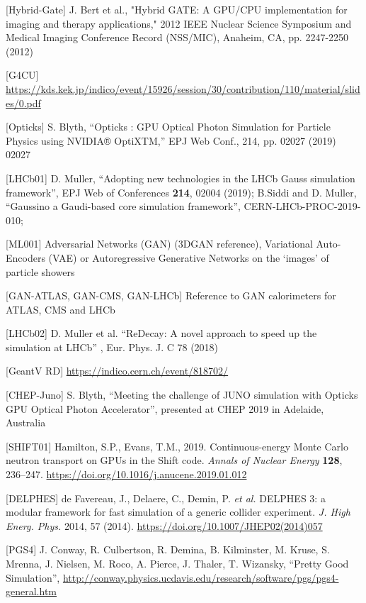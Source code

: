 \documentclass[10pt,a4paper]{article}
\begin{document}
{[}Hybrid-Gate{]} J. Bert et al., "Hybrid GATE: A GPU/CPU implementation
for imaging and therapy applications," 2012 IEEE Nuclear Science
Symposium and Medical Imaging Conference Record (NSS/MIC), Anaheim, CA,
pp. 2247-2250 (2012)

{[}G4CU{]}
\url{https://kds.kek.jp/indico/event/15926/session/30/contribution/110/material/slides/0.pdf}

{[}Opticks{]} S. Blyth, ``Opticks : GPU Optical Photon Simulation for
Particle Physics using NVIDIA® OptiXTM,'' EPJ Web Conf., 214, pp. 02027
(2019) 02027

{[}LHCb01{]} D. Muller, ``Adopting new technologies in the LHCb Gauss
simulation framework'', EPJ Web of Conferences \textbf{214}, 02004
(2019); B.Siddi and D. Muller, ``Gaussino a Gaudi-based core simulation
framework'', CERN-LHCb-PROC-2019-010;

{[}ML001{]} Adversarial Networks (GAN) (3DGAN reference), Variational
Auto-Encoders (VAE) or Autoregressive Generative Networks on the
`images' of particle showers

{[}GAN-ATLAS, GAN-CMS, GAN-LHCb{]} Reference to GAN calorimeters for
ATLAS, CMS and LHCb

{[}LHCb02{]} D. Muller et al. ``ReDecay: A novel approach to speed up
the simulation at LHCb'' , Eur. Phys. J. C 78 (2018)

{[}GeantV RD{]}
\href{https://indico.cern.ch/event/818702/}{{https://indico.cern.ch/event/818702/}}

{[}CHEP-Juno{]} S. Blyth, ``Meeting the challenge of JUNO simulation
with Opticks GPU Optical Photon Accelerator'', presented at CHEP 2019 in
Adelaide, Australia

{[}SHIFT01{]} Hamilton, S.P., Evans, T.M., 2019. Continuous-energy Monte
Carlo neutron transport on GPUs in the Shift code. \emph{Annals of
Nuclear Energy} \textbf{128}, 236--247.
\url{https://doi.org/10.1016/j.anucene.2019.01.012}

{[}DELPHES{]} de Favereau, J., Delaere, C., Demin, P. \emph{et al.}
DELPHES 3: a modular framework for fast simulation of a generic collider
experiment. \emph{J. High Energ. Phys.} 2014, 57 (2014).
\href{https://doi.org/10.1007/JHEP02(2014)057}{{https://doi.org/10.1007/JHEP02(2014)057}}

{[}PGS4{]} J. Conway, R. Culbertson, R. Demina, B. Kilminster, M. Kruse,
S. Mrenna, J. Nielsen, M. Roco, A. Pierce, J. Thaler, T. Wizansky,
``Pretty Good Simulation'',
\href{http://conway.physics.ucdavis.edu/research/software/pgs/pgs4-general.htm}{{http://conway.physics.ucdavis.edu/research/software/pgs/pgs4-general.htm}}
\end{document}
